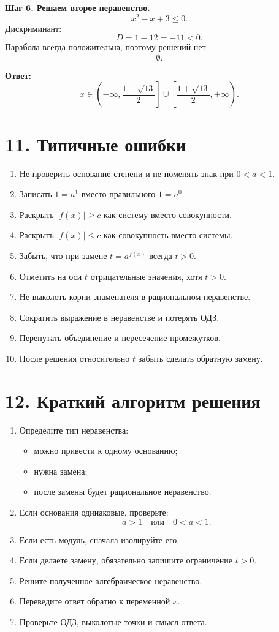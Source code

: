 \documentclass[a4paper,12pt]{article}
\newcommand{\sectionline}{\vspace{2mm}{\color{accent}\hrule height 0.6pt}\vspace{2mm}}
\begin{document}
\textbf{Шаг 6. Решаем второе неравенство.}
\[
x^2-x+3\le 0.
\]
Дискриминант:
\[
D=1-12=-11<0.
\]
Парабола всегда положительна, поэтому решений нет:
\[
\emptyset.
\]

\textbf{Ответ:}
\[
x\in
\left(-\infty,\frac{1-\sqrt{13}}{2}\right]
\cup
\left[\frac{1+\sqrt{13}}{2},+\infty\right).
\]

\section*{11. Типичные ошибки}
\sectionline

\begin{enumerate}
    \item Не проверить основание степени и не поменять знак при \(0<a<1\).
    \item Записать \(1=a^1\) вместо правильного \(1=a^0\).
    \item Раскрыть \(|f(x)|\ge c\) как систему вместо совокупности.
    \item Раскрыть \(|f(x)|\le c\) как совокупность вместо системы.
    \item Забыть, что при замене \(t=a^{f(x)}\) всегда \(t>0\).
    \item Отметить на оси \(t\) отрицательные значения, хотя \(t>0\).
    \item Не выколоть корни знаменателя в рациональном неравенстве.
    \item Сократить выражение в неравенстве и потерять ОДЗ.
    \item Перепутать объединение и пересечение промежутков.
    \item После решения относительно \(t\) забыть сделать обратную замену.
\end{enumerate}

\section*{12. Краткий алгоритм решения}
\sectionline

\begin{enumerate}
    \item Определите тип неравенства:
    \begin{itemize}
        \item можно привести к одному основанию;
        \item нужна замена;
        \item после замены будет рациональное неравенство.
    \end{itemize}
    \item Если основания одинаковые, проверьте:
    \[
    a>1 \quad \text{или} \quad 0<a<1.
    \]
    \item Если есть модуль, сначала изолируйте его.
    \item Если делаете замену, обязательно запишите ограничение \(t>0\).
    \item Решите полученное алгебраическое неравенство.
    \item Переведите ответ обратно к переменной \(x\).
    \item Проверьте ОДЗ, выколотые точки и смысл ответа.
\end{enumerate}
\end{document}

